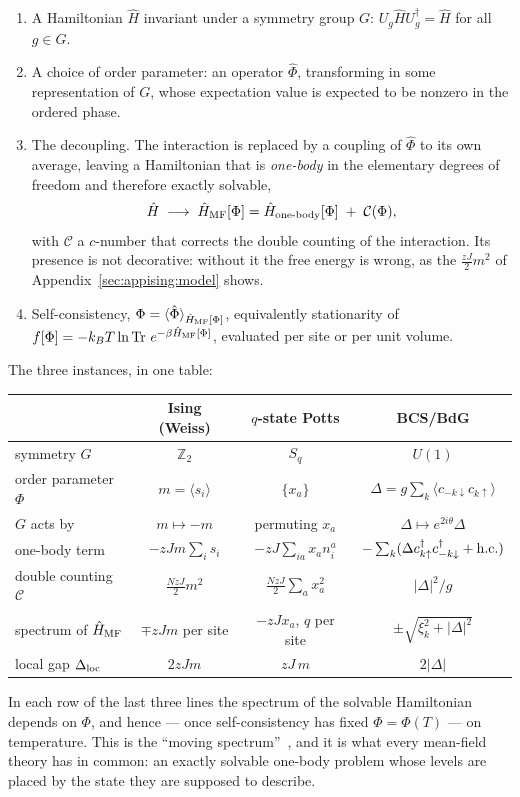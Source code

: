 \documentclass[10pt,a4paper]{article}
\theoremstyle{remark}
\newcommand{\Tr}{\operatorname{Tr}}
\begin{document}
\begin{enumerate}[leftmargin=*]
\item A Hamiltonian $\hat H$ invariant under a symmetry group $G$:
$U_g\hat HU_g^{\dagger}=\hat H$ for all $g\in G$.
\item A choice of order parameter: an operator $\hat\Phi$, transforming in some
representation of $G$, whose expectation value is expected to be nonzero in the
ordered phase.
\item The decoupling. The interaction is replaced by a coupling of $\hat\Phi$ to
its own average, leaving a Hamiltonian that is \emph{one-body} in the elementary
degrees of freedom and therefore exactly solvable,
\begin{equation}\label{eq:mfg_HMF}
\hat H\;\longrightarrow\;\hat H_{\rm MF}[\Phi]
=\hat H_{\rm one\text{-}body}[\Phi]\;+\;\mathcal{C}(\Phi),
\end{equation}
with $\mathcal{C}$ a $c$-number that corrects the double counting of the
interaction. Its presence is not decorative: without it the free energy is wrong,
as the $\tfrac{zJ}{2}m^{2}$ of Appendix~\ref{sec:appising:model} shows.
\item Self-consistency, $\Phi=\langle\hat\Phi\rangle_{\hat H_{\rm MF}[\Phi]}$,
equivalently stationarity of $f[\Phi]=-k_BT\ln\Tr\,e^{-\beta\hat H_{\rm
MF}[\Phi]}$, evaluated per site or per unit volume.
\end{enumerate}

The three instances, in one table:
\begin{center}
\begin{tabular}{lccc}
\toprule
& Ising (Weiss) & $q$-state Potts & BCS/BdG \\
\midrule
symmetry $G$ & $\mathbb{Z}_2$ & $S_q$ & $U(1)$ \\
order parameter $\Phi$ & $m=\langle s_i\rangle$ & $\{x_a\}$ & $\Delta=g\sum_k\langle c_{-k\downarrow}c_{k\uparrow}\rangle$ \\
$G$ acts by & $m\mapsto-m$ & permuting $x_a$ & $\Delta\mapsto e^{2i\theta}\Delta$ \\
one-body term & $-zJm\sum_is_i$ & $-zJ\sum_{ia}x_an_i^{a}$
  & $-\sum_k(\Delta c^{\dagger}_{k\uparrow}c^{\dagger}_{-k\downarrow}+{\rm h.c.})$ \\
double counting $\mathcal{C}$ & $\tfrac{N zJ}{2}m^{2}$
  & $\tfrac{NzJ}{2}\sum_ax_a^{2}$ & $|\Delta|^{2}/g$ \\
spectrum of $\hat H_{\rm MF}$ & $\mp zJm$ per site & $-zJx_a$, $q$ per site
  & $\pm\sqrt{\xi_k^{2}+|\Delta|^{2}}$ \\
local gap $\Delta_{\rm loc}$ & $2zJm$ & $zJ\,m$ & $2|\Delta|$ \\
\bottomrule
\end{tabular}
\end{center}
In each row of the last three lines the spectrum of the solvable Hamiltonian
depends on $\Phi$, and hence --- once self-consistency has fixed $\Phi=\Phi(T)$
--- on temperature. This is the ``moving spectrum''~\cite{DOSNotes}, and it is what every mean-field theory has in
common: an exactly solvable one-body problem whose levels are placed by the
state they are supposed to describe.
\end{document}
